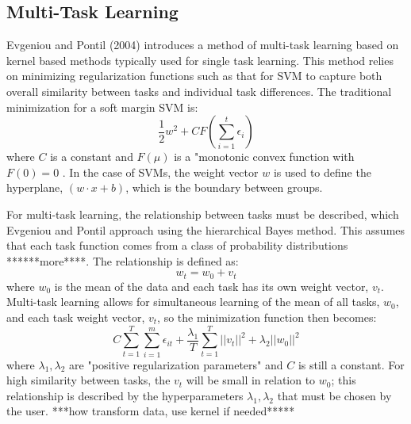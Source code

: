 \documentclass{llncs}
\begin{document}
\subsection{Multi-Task Learning}
Evgeniou and Pontil (2004) introduces a method of multi-task learning based on kernel based methods typically used for single task learning.  This method relies on minimizing regularization functions such as that for SVM to capture both overall similarity between tasks and individual task differences.  The traditional minimization for a soft margin SVM is:\\
\begin{equation}
\frac{1}{2}w^2 + C F(\sum_{i=1}^t \epsilon_i)
\end{equation}
where $C$ is a constant and $F(\mu)$ is a "monotonic convex function with $F(0)=0$ \cite{svm}. In the case of SVMs, the weight vector $w$ is used to define the hyperplane, $(w \cdot x +b)$,  which is the boundary between groups. 

For multi-task learning, the relationship between tasks must be described, which Evgeniou and Pontil approach using the hierarchical Bayes method. This assumes that each task function comes from a class of probability distributions ******more****.  The relationship is defined as:\\
\begin{equation}
 w_t = w_0 + v_t
\end{equation}
where $w_0$ is the mean of the data and each task has its own weight vector, $v_t$. Multi-task learning allows for simultaneous learning of the mean of all tasks, $w_0$, and each task weight vector, $v_t$, so the minimization function then becomes:\\
\begin{equation}
 C \sum_{t=1}^T \sum_{i=1}^m \epsilon_{it} + \frac{\lambda_1}{T} \sum_{t=1}^T ||v_t||^2 + \lambda_2||w_0||^2
\end{equation}
where $\lambda_1, \lambda_2$ are "positive regularization parameters" and $C$ is still a constant.  For high similarity between tasks, the $v_t$ will be small in relation to $w_0$; this relationship is described by the hyperparameters $\lambda_1, \lambda_2$ that must be chosen by the user.
***how transform data, use kernel if needed*****
\end{document}
